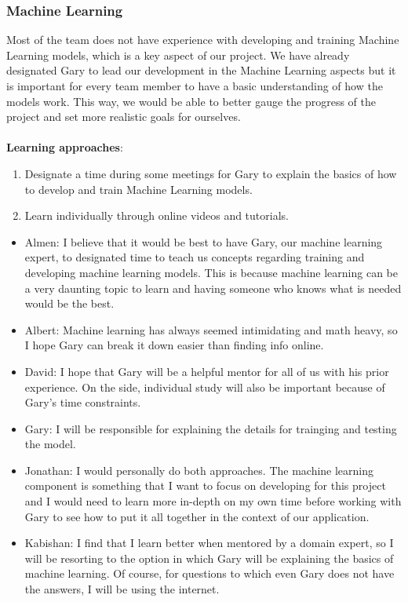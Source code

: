 \documentclass[12pt,letterpaper]{article}
\newcommand{\term}[2][]{\ifthenelse{\equal{#1}{}}{\hyperref[Term:#2]{\textbf{#2}}}{\hyperref[Term:#1]{\textbf{#2}}}}
\begin{document}
\subsubsection{Machine Learning}
Most of the team does not have experience with developing and training Machine Learning models, which is a key aspect of our project. We have already designated Gary to lead our development in the Machine Learning aspects but it is important for every team member to have a basic understanding of how the models work. This way, we would be able to better gauge the progress of the project and set more realistic goals for ourselves. \\
\\
\noindent \textbf{Learning approaches}:
\begin{enumerate}
    \item Designate a time during some meetings for Gary to explain the basics of how to develop and train Machine Learning models.
    \item Learn individually through online videos and tutorials.
\end{enumerate}

\begin{itemize}
    \item Almen: I believe that it would be best to have Gary, our machine learning expert, to designated time to teach us concepts regarding training and developing machine learning models. This is because machine learning can be a very daunting topic to learn and having someone who knows what is needed would be the best.
    \item Albert: Machine learning has always seemed intimidating and math heavy, so I hope Gary can break it down easier than finding info online.
    \item David: I hope that Gary will be a helpful mentor for all of us with his prior \term{ML} experience. On the side, individual study will also be important because of Gary's time constraints.
    \item Gary: I will be responsible for explaining the details for trainging and testing the \term{ML} model.
    \item Jonathan: I would personally do both approaches. The machine learning component is something that I want to focus on developing for this project and I would need to learn more in-depth on my own time before working with Gary to see how to put it all together in the context of our application.
    \item Kabishan: I find that I learn better when mentored by a domain expert, so I will be resorting to the option in which Gary will be explaining the basics of machine learning. Of course, for questions to which even Gary does not have the answers, I will be using the internet.
\end{itemize}
\end{document}
